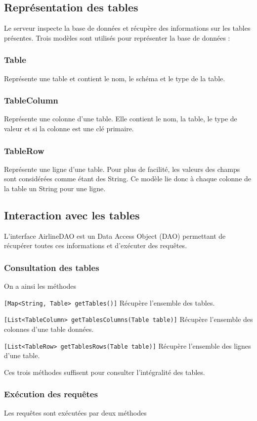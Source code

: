 \subsection{Représentation des tables}
Le serveur inspecte la base de données et récupère des informations sur les tables présentes. Trois modèles sont utilisés pour représenter la base de données :
\subsubsection{Table}
Représente une table et contient le nom, le schéma et le type de la table.
\subsubsection{TableColumn}
Représente une colonne d'une table. Elle contient le nom, la table, le type de valeur et si la colonne est une clé primaire.
\subsubsection{TableRow}
Représente une ligne d'une table. Pour plus de facilité, les valeurs des champs sont considérées comme étant des String. Ce modèle lie donc à chaque colonne de la table un String pour une ligne.
\subsection{Interaction avec les tables}
L'interface AirlineDAO est un Data Access Object (DAO) permettant de récupérer toutes ces informations et d'exécuter des requêtes. 
\subsubsection{Consultation des tables}
On a ainsi les méthodes 

\texttt{[Map<String, Table> getTables()]} Récupère l'ensemble des tables.

\texttt{[List<TableColumn> getTablesColumns(Table table)]} Récupère l'ensemble des colonnes d'une table données.

\texttt{[List<TableRow> getTablesRows(Table table)]} Récupère l'ensemble des lignes d'une table.

Ces trois méthodes suffisent pour consulter l'intégralité des tables.
\subsubsection{Exécution des requêtes}
Les requêtes sont exécutées par deux méthodes 

